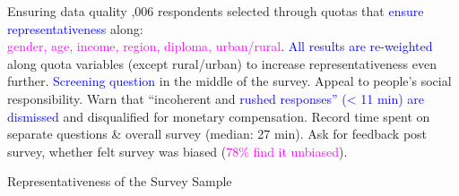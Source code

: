 

\begin{frame}{Ensuring data quality}
\bbs
{},006 respondents selected through quotas that  \textcolor{blue}{ensure representativeness} along: \\ \textcolor{magenta}{gender, age, income, region, diploma, urban/rural}.
\ip \textcolor{blue}{All results are re-weighted} along quota variables (except rural/urban) to increase representativeness even further.
\ip \textcolor{blue}{Screening question} in the middle of the survey. 
\ip Appeal to people's social responsibility. 
\ip Warn that ``incoherent and \textcolor{blue}{rushed responses'' (< 11 min) are dismissed} and disqualified for monetary compensation.
\ip Record time spent on separate questions \& overall survey (median: 27 min).
\ip Ask for feedback post survey, whether felt survey was biased (\textcolor{magenta}{78\% find it unbiased}).
\ee
\end{frame}

\begin{frame}{Representativeness of the Survey Sample}
\begin{table}[h!]
	\begin{center}
		\scalebox{0.55}{}
	\end{center}
\end{table}	
\end{frame}

